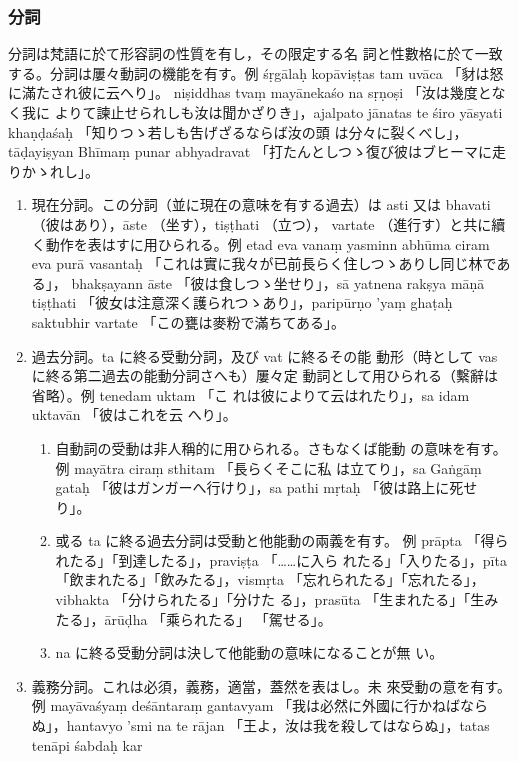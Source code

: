 \subsubsection{分詞}
\numberParagraph \label{np:232}
分詞は梵語に於て形容詞の性質を有し，その限定する名
詞と性數格に於て一致する。分詞は屢々動詞の機能を有す。例
śṛgālaḥ kopāviṣṭas tam uvāca 「豺は怒に滿たされ彼に云へり」。
niṣiddhas tvaṃ mayānekaśo na sṛṇoṣi 「汝は幾度となく我に
よりて諫止せられしも汝は聞かざりき」，ajalpato jānatas te
śiro yāsyati khaṇḍaśaḥ 「知りつゝ若しも吿げざるならば汝の頭
は分々に裂くべし」，tāḍayiṣyan Bhīmaṃ punar abhyadravat
「打たんとしつゝ復び彼はブヒーマに走りかゝれし」。
\begin{enumerate}[label=(\arabic*)]
\item 現在分詞。この分詞（並に現在の意味を有する過去）は
asti 又は bhavati （彼はあり），āste （坐す），tiṣṭhati （立つ），
vartate （進行す）と共に續く動作を表はすに用ひられる。例
etad eva vanaṃ yasminn abhūma ciram eva purā vasantaḥ
「これは實に我々が已前長らく住しつゝありし同じ林である」，
bhakṣayann āste 「彼は食しつゝ坐せり」，sā yatnena rakṣya\-%
māṇā tiṣṭhati 「彼女は注意深く護られつゝあり」，paripūrṇo
'yaṃ ghaṭaḥ saktubhir vartate 「この甕は麥粉で滿ちてある」。
\item 過去分詞。ta に終る受動分詞，及び vat に終るその能
動形（時として vas に終る第二過去の能動分詞さへも）屢々定
動詞として用ひられる（繫辭は省略）。例 tenedam uktam 「こ
れは彼によりて云はれたり」，sa idam uktavān 「彼はこれを云
へり」。
\begin{enumerate}[label=(\alph*)]
\item 自動詞の受動は非人稱的に用ひられる。さもなくば能動
の意味を有す。例 mayātra ciraṃ sthitam 「長らくそこに私
は立てり」，sa Gaṅgāṃ gataḥ 「彼はガンガーへ行けり」，sa
pathi mṛtaḥ 「彼は路上に死せり」。
\item 或る ta に終る過去分詞は受動と他能動の兩義を有す。
例 prāpta 「得られたる」「到達したる」，praviṣṭa 「……に入ら
れたる」「入りたる」，pīta 「飲まれたる」「飲みたる」，vismṛta
「忘れられたる」「忘れたる」，vibhakta 「分けられたる」「分けた
る」，prasūta 「生まれたる」「生みたる」，ārūḍha 「乘られたる」
「駕せる」。
\item na に終る受動分詞は決して他能動の意味になることが無
い。
\end{enumerate}
\item 義務分詞。これは必須，義務，適當，蓋然を表はし。未
來受動の意を有す。例 mayāvaśyaṃ deśāntaraṃ gantavyam
「我は必然に外國に行かねばならぬ」，hantavyo 'smi na te rājan
「王よ，汝は我を殺してはならぬ」，tatas tenāpi śabdaḥ kar\-%

\end{enumerate}
